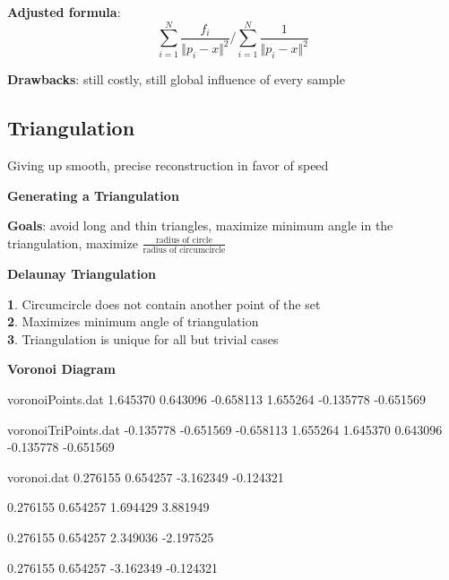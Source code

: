 \textbf{Adjusted formula}:
$$\sum_{i = 1}^N \frac{f_i}{\Vert p_i - x \Vert ^2} / \sum_{i = 1}^N \frac{1}{\Vert p_i - x \Vert ^2}$$

\textbf{Drawbacks}: still costly, still global influence of every sample

\subsection{Triangulation}
Giving up smooth, precise reconstruction in favor of speed

\textbf{Generating a Triangulation}

\textbf{Goals}: avoid long and thin triangles, maximize minimum angle in the triangulation, maximize $\frac{\text{radius of circle}}{\text{radius of circumcircle}}$

\textbf{Delaunay Triangulation}

\textbf{1}. Circumcircle does not contain another point of the set \\
\textbf{2}. Maximizes minimum angle of triangulation \\
\textbf{3}. Triangulation is unique for all but trivial cases

\textbf{Voronoi Diagram}

\begin{filecontents*}{voronoiPoints.dat}
1.645370 0.643096
-0.658113 1.655264 
-0.135778 -0.651569 
\end{filecontents*}

\begin{filecontents*}{voronoiTriPoints.dat}
-0.135778 -0.651569 
-0.658113 1.655264 
1.645370 0.643096 
-0.135778 -0.651569 
\end{filecontents*}

\begin{filecontents*}{voronoi.dat}
0.276155 0.654257
-3.162349 -0.124321

0.276155 0.654257
1.694429 3.881949

0.276155 0.654257
2.349036 -2.197525

0.276155 0.654257
-3.162349 -0.124321
\end{filecontents*}

